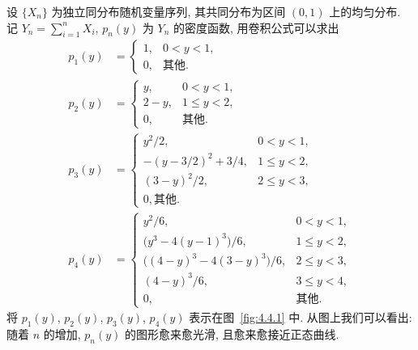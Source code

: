 \begin{example}\label{exam:4.4.2}
    设 $ \{ X_n \} $ 为独立同分布随机变量序列, 其共同分布为区间 $ ( 0, 1 ) $ 上的均匀分布.
    记 $ Y_n = \sum_{i = 1}^n X_i $, $ p_n (y) $ 为 $ Y_n $ 的密度函数, 用卷积公式可以求出
    \begin{align*}
        p_1 ( y ) & =
        \begin{cases}
            1, & 0 < y < 1,\\
            0, & \text{其他}.
        \end{cases}\\
        p_2 ( y ) & =
        \begin{cases}
            y, & 0 < y < 1,\\
            2 - y, & 1 \leq y < 2,\\
            0, & \text{其他}.
        \end{cases}\\
        p_3 ( y ) & =
        \begin{cases}
            y^2 / 2, & 0 < y < 1,\\
            - ( y - 3 / 2 )^2 + 3 / 4, & 1 \leq y < 2,\\
            ( 3 - y )^2 / 2, & 2 \leq y < 3,\\
            0, \text{其他}.
        \end{cases}\\
        p_4 ( y ) & =
        \begin{cases}
            y^2 / 6, & 0 < y < 1,\\
            \bigl( y^3 - 4 ( y - 1 )^3 \bigr) / 6, & 1 \leq y < 2,\\
            \bigl( ( 4 - y )^3 - 4 ( 3 - y )^3 \bigr) / 6, & 2 \leq y < 3,\\
            ( 4 - y )^3 / 6, & 3 \leq y < 4,\\
            0, & \text{其他}.
        \end{cases}
    \end{align*}
    将 $ p_1 (y) $, $ p_2 (y) $, $ p_3 (y) $, $ p_4 (y) $ 表示在图~\ref{fig:4.4.1} 中.
    从图上我们可以看出: 随着 $ n $ 的增加, $ p_n ( y ) $ 的图形愈来愈光滑, 且愈来愈接近正态曲线.
\end{example}


